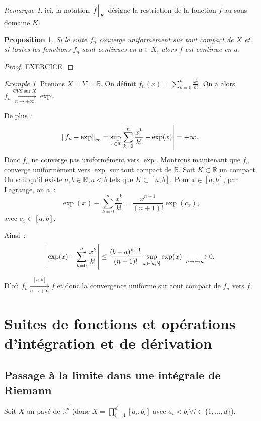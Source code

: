 \documentclass{report}
\newtheorem{prp}[thm]{Proposition}
\theoremstyle{definition}
\theoremstyle{remark}
\newtheorem*{rmq}{Remarque}
\newtheorem{ex}{Exemple}[chapter]
\numberwithin{equation}{section}
\newcommand{\R}{\mathbb R}
\newcommand{\CONV}[5]{\xrightarrow[#2 \to #3]{#4 \text{ #5 } #1}}
\newcommand{\CVS}[3]{\CONV{#1}{#2}{#3}{CVS}{sur}}
\newcommand{\restr}[2]{\left.#1\vphantom{\big|}\right|_{#2}}
\newcommand{\pinfty}{{+\infty}}
\begin{document}
			\begin{rmq} ici, la notation $\restr fK$ désigne la restriction de la fonction $f$ au sous-domaine $K$.
			\end{rmq}

			\begin{prp}\label{prp:cvuccontinues} Si la suite $f_n$ converge uniformément sur tout compact de $X$ et si toutes les fonctions $f_n$ sont continues
			en $a \in X$, alors $f$ est continue en $a$.
			\end{prp}

			\begin{proof} EXERCICE.
			\end{proof}

			\begin{ex} Prenons $X = Y = \R$. On définit $f_n(x) = \sum_{k=0}^n\frac {x^k}{k!}$. On a alors $f_n \CVS Xn\pinfty \exp$.

			De plus~:
			\begin{equation}
				\norm {f_n - \exp}_\infty = \sup_{x \in \R} \abs {\sum_{k=0}^n\frac {x^k}{k!} - \exp(x)} = \pinfty.
			\end{equation}
			Donc $f_n$ ne converge pas uniformément vers $\exp$. Montrons maintenant que $f_n$ converge uniformément vers $\exp$ sur tout compact de $\R$.
			Soit $K \subset \R$ un compact. On sait qu'il existe $a, b \in \R, a < b$ tels que $K \subset [a, b]$. Pour $x \in [a, b]$, par Lagrange, on a~:
			\begin{equation}
				\exp(x) - \sum_{k=0}^n\frac {x^k}{k!} = \frac {x^{n+1}}{(n+1)!}\exp(c_x),
			\end{equation}
			avec $c_x \in [a, b]$.

			Ainsi~:
			\begin{equation}
				\abs {\exp(x) - \sum_{k=0}^n\frac {x^k}{k!}} \leq \frac {(b-a)^{n+1}}{(n+1)!}\sup_{x \in [a, b]}\exp(x) \xrightarrow[n \to \pinfty]{} 0.
			\end{equation}

			D'où $f_n \xrightarrow[n \to \pinfty]{[a, b]} f$ et donc la convergence uniforme sur tout compact de $f_n$ vers $f$.
			\end{ex}

	\section{Suites de fonctions et opérations d'intégration et de dérivation}
		\subsection{Passage à la limite dans une intégrale de Riemann}
			Soit $X$ un pavé de $\R^d$ (donc $X = \prod_{i=1}^d[a_i, b_i]$ avec $a_i < b_i \forall i \in \{1, \ldots, d\}$).
\end{document}
